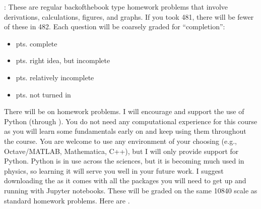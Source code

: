 \documentclass[letterpaper,10pt,english]{jupyterBook}
\begin{document}
\sphinxAtStartPar
{}: These are regular back\sphinxhyphen{}of\sphinxhyphen{}the\sphinxhyphen{}book type homework problems that involve derivations, calculations, figures, and graphs. If you took 481, there will be fewer of these in 482. Each question will be coarsely graded for “completion”:
\begin{itemize}
\item {} 
 pts. complete

\item {} 
 pts. right idea, but incomplete

\item {} 
 pts. relatively incomplete

\item {} 
 pts. not turned in

\end{itemize}

\sphinxAtStartPar
{} There will be  on homework problems. I will encourage and support the use of Python (through ). You do not need any computational experience for this course as you will learn some fundamentals early on and keep using them throughout the course. You are welcome to use any environment of your choosing (e.g., Octave/MATLAB, Mathematica, C++), but I will only provide support for Python. Python is in use across the sciences, but it is becoming much used in physics, so learning it will serve you well in your future work. I suggest downloading the  as it comes with all the packages you will need to get up and running with Jupyter notebooks. These will be graded on the same 10\sphinxhyphen{}8\sphinxhyphen{}4\sphinxhyphen{}0 scale as standard homework problems. Here are .
\end{document}
